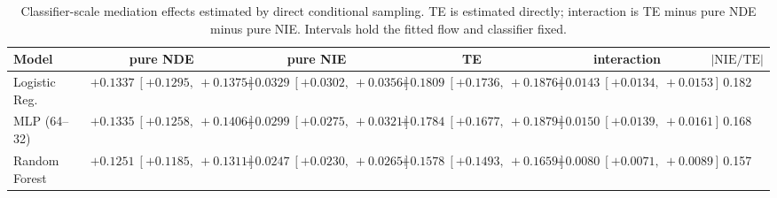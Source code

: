 \begin{table}[htbp]
  \centering
  \caption{Classifier-scale mediation effects estimated by direct conditional sampling. TE is estimated directly; interaction is TE minus pure NDE minus pure NIE. Intervals hold the fitted flow and classifier fixed.}
  \label{tab:adult_gap_overall}
  \begin{tabular}{lccccc}
    \toprule
    Model & pure NDE & pure NIE & TE & interaction & $|\mathrm{NIE}/\mathrm{TE}|$ \\
    \midrule
    Logistic Reg. & $+0.1337\ [+0.1295,\ +0.1375]$ & $+0.0329\ [+0.0302,\ +0.0356]$ & $+0.1809\ [+0.1736,\ +0.1876]$ & $+0.0143\ [+0.0134,\ +0.0153]$ & 0.182 \\
    MLP (64--32) & $+0.1335\ [+0.1258,\ +0.1406]$ & $+0.0299\ [+0.0275,\ +0.0321]$ & $+0.1784\ [+0.1677,\ +0.1879]$ & $+0.0150\ [+0.0139,\ +0.0161]$ & 0.168 \\
    Random Forest & $+0.1251\ [+0.1185,\ +0.1311]$ & $+0.0247\ [+0.0230,\ +0.0265]$ & $+0.1578\ [+0.1493,\ +0.1659]$ & $+0.0080\ [+0.0071,\ +0.0089]$ & 0.157 \\
    \bottomrule
  \end{tabular}
\end{table}
